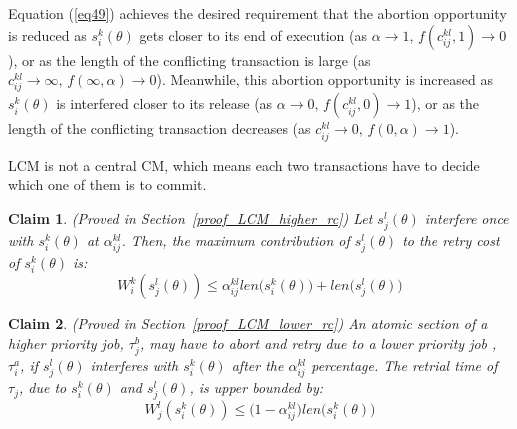 \documentclass[conference]{sig-alternate}
\newtheorem{clm}{Claim}
\begin{document}
Equation (\ref{eq49}) achieves the desired requirement that the abortion opportunity is reduced as $s_{i}^{k}(\theta)$ gets
closer to its end of execution (as $\alpha\rightarrow1,\, f(c_{ij}^{kl},1)\rightarrow0$),
or as the length of the conflicting transaction is large (as $c_{ij}^{kl}\rightarrow\infty,\, f(\infty,\alpha)\rightarrow0$).
Meanwhile, this abortion opportunity is increased as $s_{i}^{k}(\theta)$
is interfered closer to its release (as $\alpha\rightarrow0,\, f(c_{ij}^{kl},0)\rightarrow1$),
or as the length of the conflicting transaction decreases (as $c_{ij}^{kl}\rightarrow0,\, f(0,\alpha)\rightarrow1$).

LCM is not a central CM, which means each two transactions have to decide which one of them is to commit.

\begin{clm}
\label{LCM_higher_rc}
(Proved in Section~\ref{proof_LCM_higher_rc}) Let $s_{j}^{l}(\theta)$ interfere once with $s_{i}^{k}(\theta)$ at $\alpha_{ij}^{kl}$. Then, the maximum contribution of $s_{j}^{l}(\theta)$ to the retry cost of $s_{i}^{k}(\theta)$ is:
\begin{equation}
W_i^k(s_j^l(\theta))\le \alpha_{ij}^{kl}len\Big(s_{i}^{k}(\theta)\Big)+len\Big(s_{j}^{l}(\theta)\Big)\label{eq47}\end{equation}
\end{clm}

\begin{clm}
\label{LCM_lower_rc}
(Proved in Section~\ref{proof_LCM_lower_rc}) An atomic section of a higher priority job, $\tau_{j}^b$, may have to abort and retry due to a lower priority job	, $\tau_{i}^a$, if $s_{j}^{l}(\theta)$ interferes
with $s_{i}^{k}(\theta)$ after the $\alpha_{ij}^{kl}$ percentage.
The retrial time of $\tau_{j}$, due to $s_{i}^{k}(\theta)$ and $s_{j}^{l}(\theta)$,
is upper bounded by:
 \begin{equation}
W_j^l(s_i^k(\theta))\le \Big(1-\alpha_{ij}^{kl}\Big)len\Big(s_{i}^{k}(\theta)\Big)\label{eq48}\end{equation}
\end{clm}

\end{document}
